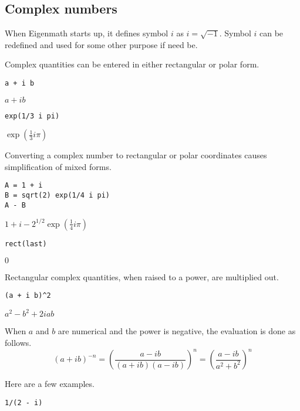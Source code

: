 \subsection{Complex numbers}

When Eigenmath starts up, it defines symbol $i$ as $i=\sqrt{-1}$.
Symbol $i$ can be redefined and used for some other purpose if need be.

\bigskip
\noindent
Complex quantities can be entered in either rectangular or polar form.

{\color{blue}
\begin{verbatim}
a + i b
\end{verbatim}
}

\noindent
$a+ib$

{\color{blue}
\begin{verbatim}
exp(1/3 i pi)
\end{verbatim}
}

\noindent
$\exp\left(\tfrac{1}{3}i\pi\right)$

\bigskip
\noindent
Converting a complex number to rectangular or polar coordinates causes
simplification of mixed forms.

{\color{blue}
\begin{verbatim}
A = 1 + i
B = sqrt(2) exp(1/4 i pi)
A - B
\end{verbatim}
}

\noindent
$1+i-2^{1/2}\exp\left(\tfrac{1}{4}i\pi\right)$

{\color{blue}
\begin{verbatim}
rect(last)
\end{verbatim}
}

\noindent
$0$

\bigskip
\noindent
Rectangular complex quantities, when raised to a power, are multiplied out.

{\color{blue}
\begin{verbatim}
(a + i b)^2
\end{verbatim}
}

\noindent
$a^2-b^2+2iab$

\bigskip
\noindent
When $a$ and $b$ are numerical and the power is negative, the evaluation is done as follows.
\begin{equation*}
(a+ib)^{-n}
=\left(\frac{a-ib}{(a+ib)(a-ib)}\right)^n=
\left(\frac{a-ib}{a^2+b^2}\right)^n
\end{equation*}

\noindent
Here are a few examples.

{\color{blue}
\begin{verbatim}
1/(2 - i)
\end{verbatim}
}

